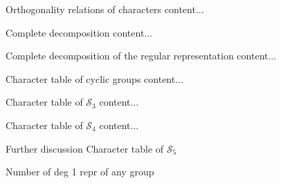 \documentclass[handout, 10pt]{beamer}
\newcommand{\Sym}{\mathcal{S}}
\begin{document}
	\begin{frame}{Orthogonality relations of characters}
		content...
	\end{frame}
	
	\begin{frame}{Complete decomposition}
		content...
	\end{frame}
	
	\begin{frame}{Complete decomposition of the regular representation}
		content...
	\end{frame}
	
	\begin{frame}{Character table of cyclic groups}
		content...
	\end{frame}
	
	\begin{frame}{Character table of $\Sym_3$}
		content...
	\end{frame}
	
	\begin{frame}{Character table of $\Sym_4$}
		content...
	\end{frame}
	
	\begin{frame}{Further discussion}
		Character table of $\Sym_5$
		
		Number of deg 1 repr of any group
	\end{frame}
	
\end{document}
